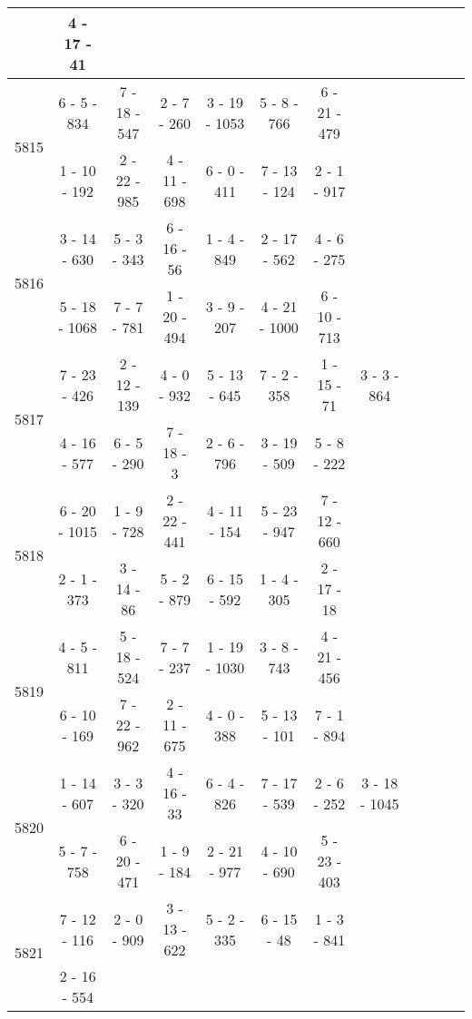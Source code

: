 \begin{longtable}{c | c | c | c | c | c | c | c | c | c | c | c}
&
4 - 17 - 41
&\space\\\hline
\multirow{2}{*}{5815}
& 6 - 5 - 834
&
7 - 18 - 547
&
2 - 7 - 260
&
3 - 19 - 1053
&
5 - 8 - 766
&
6 - 21 - 479
&\space\\* \space
&
1 - 10 - 192
&
2 - 22 - 985
&
4 - 11 - 698
&
6 - 0 - 411
&
7 - 13 - 124
&
2 - 1 - 917
&\space\\\hline
\multirow{2}{*}{5816}
& 3 - 14 - 630
&
5 - 3 - 343
&
6 - 16 - 56
&
1 - 4 - 849
&
2 - 17 - 562
&
4 - 6 - 275
&\space\\* \space
&
5 - 18 - 1068
&
7 - 7 - 781
&
1 - 20 - 494
&
3 - 9 - 207
&
4 - 21 - 1000
&
6 - 10 - 713
&\space\\\hline
\multirow{2}{*}{5817}
& 7 - 23 - 426
&
2 - 12 - 139
&
4 - 0 - 932
&
5 - 13 - 645
&
7 - 2 - 358
&
1 - 15 - 71
&
3 - 3 - 864
\\* \space
&
4 - 16 - 577
&
6 - 5 - 290
&
7 - 18 - 3
&
2 - 6 - 796
&
3 - 19 - 509
&
5 - 8 - 222
&\space\\\hline
\multirow{2}{*}{5818}
& 6 - 20 - 1015
&
1 - 9 - 728
&
2 - 22 - 441
&
4 - 11 - 154
&
5 - 23 - 947
&
7 - 12 - 660
&\space\\* \space
&
2 - 1 - 373
&
3 - 14 - 86
&
5 - 2 - 879
&
6 - 15 - 592
&
1 - 4 - 305
&
2 - 17 - 18
&\space\\\hline
\multirow{2}{*}{5819}
& 4 - 5 - 811
&
5 - 18 - 524
&
7 - 7 - 237
&
1 - 19 - 1030
&
3 - 8 - 743
&
4 - 21 - 456
&\space\\* \space
&
6 - 10 - 169
&
7 - 22 - 962
&
2 - 11 - 675
&
4 - 0 - 388
&
5 - 13 - 101
&
7 - 1 - 894
&\space\\\hline
\multirow{2}{*}{5820}
& 1 - 14 - 607
&
3 - 3 - 320
&
4 - 16 - 33
&
6 - 4 - 826
&
7 - 17 - 539
&
2 - 6 - 252
&
3 - 18 - 1045
\\* \space
&
5 - 7 - 758
&
6 - 20 - 471
&
1 - 9 - 184
&
2 - 21 - 977
&
4 - 10 - 690
&
5 - 23 - 403
&\space\\\hline
\multirow{2}{*}{5821}
& 7 - 12 - 116
&
2 - 0 - 909
&
3 - 13 - 622
&
5 - 2 - 335
&
6 - 15 - 48
&
1 - 3 - 841
&\space\\* \space
&
2 - 16 - 554
&


\end{longtable}
